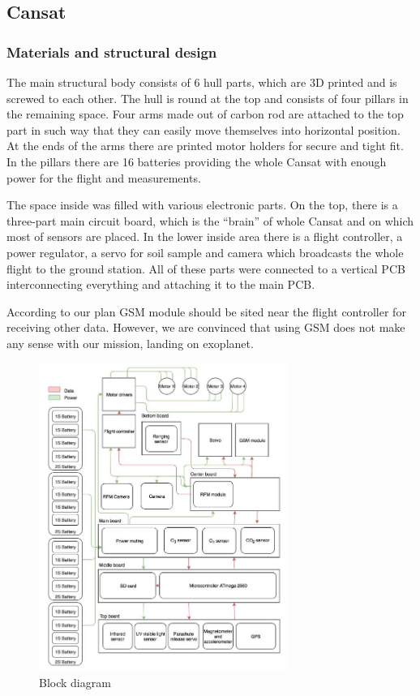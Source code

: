 \documentclass{cfp}
\begin{document}
\subsection{Cansat}
\subsubsection{Materials and structural design}
\par The main structural body consists of 6 hull parts, which are 3D printed and is screwed to each other. The hull is round at the top and consists of four pillars in the remaining space. Four arms made out of carbon rod are attached to the top part in such way that they can easily move themselves into horizontal position. At the ends of the arms there are printed motor holders for secure and tight fit. In the pillars there are 16 batteries providing the whole Cansat with enough power for the flight and measurements.
\par The space inside was filled with various electronic parts. On the top, there is a three-part main circuit board, which is the “brain” of whole Cansat and on which most of sensors are placed. In the lower inside area there is a flight controller, a power regulator, a servo for soil sample and camera which broadcasts the whole flight to the ground station. All of these parts were  connected to a vertical PCB interconnecting everything and attaching it to the main PCB.
\par According to our plan GSM module should be sited near the flight controller for receiving other data. However, we are convinced that using GSM does not make any sense with our mission, landing on exoplanet.
\begin{figure}[!h]
\centering
\caption{Block diagram}
\includegraphics[width=230pt]{block_diagram.JPG}
\end{figure}
\end{document}
